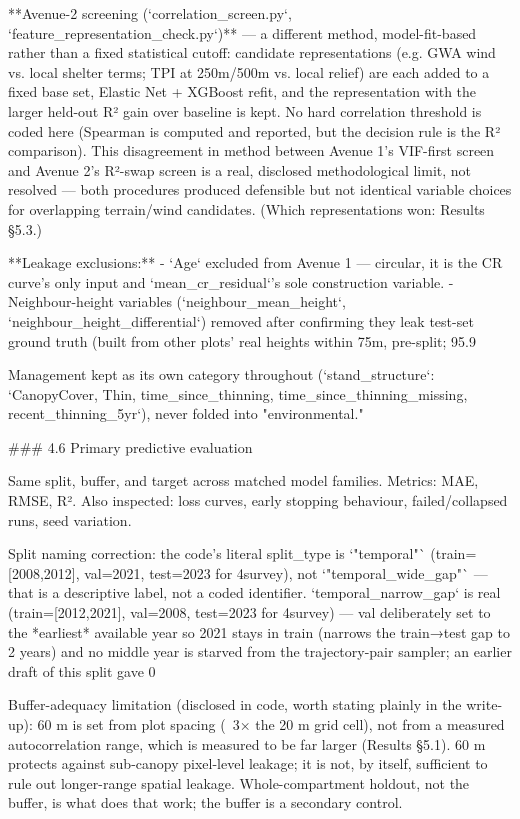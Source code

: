 \documentclass[11pt,a4paper]{report}
\begin{document}
**Avenue-2 screening (`correlation_screen.py`, `feature_representation_check.py`)** — a different method, model-fit-based rather than a fixed statistical cutoff: candidate representations (e.g. GWA wind vs. local shelter terms; TPI at 250m/500m vs. local relief) are each added to a fixed base set, Elastic Net + XGBoost refit, and the representation with the larger held-out R² gain over baseline is kept. No hard correlation threshold is coded here (Spearman is computed and reported, but the decision rule is the R² comparison). This disagreement in method between Avenue 1's VIF-first screen and Avenue 2's R²-swap screen is a real, disclosed methodological limit, not resolved — both procedures produced defensible but not identical variable choices for overlapping terrain/wind candidates. (Which representations won: Results §5.3.)

**Leakage exclusions:**
- `Age` excluded from Avenue 1 — circular, it is the CR curve's only input and `mean_cr_residual`'s sole construction variable.
- Neighbour-height variables (`neighbour_mean_height`, `neighbour_height_differential`) removed after confirming they leak test-set ground truth (built from other plots' real heights within 75m, pre-split; 95.9%

Management kept as its own category throughout (`stand_structure`: `CanopyCover, Thin, time_since_thinning, time_since_thinning_missing, recent_thinning_5yr`), never folded into "environmental."

### 4.6 Primary predictive evaluation

Same split, buffer, and target across matched model families. Metrics: MAE, RMSE, R². Also inspected: loss curves, early stopping behaviour, failed/collapsed runs, seed variation.

Split naming correction: the code's literal split_type is `"temporal"` (train=[2008,2012], val=2021, test=2023 for 4survey), not `"temporal_wide_gap"` — that is a descriptive label, not a coded identifier. `temporal_narrow_gap` is real (train=[2012,2021], val=2008, test=2023 for 4survey) — val deliberately set to the *earliest* available year so 2021 stays in train (narrows the train→test gap to 2 years) and no middle year is starved from the trajectory-pair sampler; an earlier draft of this split gave 0%

Buffer-adequacy limitation (disclosed in code, worth stating plainly in the write-up): 60 m is set from plot spacing (~3× the 20 m grid cell), not from a measured autocorrelation range, which is measured to be far larger (Results §5.1). 60 m protects against sub-canopy pixel-level leakage; it is not, by itself, sufficient to rule out longer-range spatial leakage. Whole-compartment holdout, not the buffer, is what does that work; the buffer is a secondary control.
\end{document}
